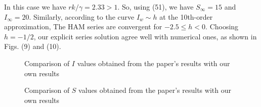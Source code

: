 \documentclass[10pt]{article}
\begin{document}
  In this case we have $r k / \gamma=2.33>1$. So, using (51), we have $S_{\infty}=15$ and $I_{\infty}=20$. Similarly, according to the curve $I_{w} \sim h$ at the 10th-order approximation, The HAM series are convergent for $-2.5 \leqslant h<0$. Choosing $h=-1 / 2$, our explicit series solution agree well with numerical ones, as shown in Figs. (9) and (10).\begin{figure}[htbp]
  \centering
  \hfill
  \caption{Comparison of \(I\) values obtained from the paper's results with our own results  }
  \end{figure}
  \begin{figure}[htbp]
  \centering
  \hfill
  \caption{Comparison of \(S\) values obtained from the paper's results with our own results  }
   \end{figure}
\end{document}
